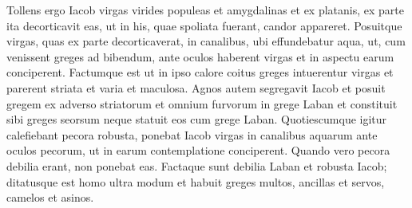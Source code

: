 \begin{biblechapter}
\begin{biblechapter}
\begin{biblechapter}
\begin{biblechapter}
\begin{biblechapter}
\begin{biblechapter}
\begin{biblechapter}
\begin{biblechapter}
\begin{biblechapter}
\begin{biblechapter}
\begin{biblechapter}
\begin{biblechapter}
\begin{biblechapter}
\begin{biblechapter}
\begin{biblechapter}
\begin{biblechapter}
\begin{biblechapter}
\begin{biblechapter}
\begin{biblechapter}
\begin{biblechapter}
\begin{biblechapter}
\begin{biblechapter}
\begin{biblechapter}
\begin{biblechapter}
\begin{biblechapter}
\begin{biblechapter}
\begin{biblechapter}
\begin{biblechapter}
\begin{biblechapter}
\begin{biblechapter}
 \verse Tollens ergo Iacob virgas virides populeas et amygdalinas et ex platanis, ex parte ita decorticavit eas, ut in his, quae spoliata fuerant, candor appareret. 
\verse Posuitque virgas, quas ex parte decorticaverat, in canalibus, ubi effundebatur aqua, ut, cum venissent greges ad bibendum, ante oculos haberent virgas et in aspectu earum conciperent. 
\verse Factumque est ut in ipso calore coitus greges intuerentur virgas et parerent striata et varia et maculosa.
 \verse Agnos autem segregavit Iacob et posuit gregem ex adverso striatorum et omnium furvorum in grege Laban et constituit sibi greges seorsum neque statuit eos cum grege Laban. 
\verse Quotiescumque igitur calefiebant pecora robusta, ponebat Iacob virgas in canalibus aquarum ante oculos pecorum, ut in earum contemplatione conciperent. 
\verse Quando vero pecora debilia erant, non ponebat eas. Factaque sunt debilia Laban et robusta Iacob; 
\verse ditatusque est homo ultra modum et habuit greges multos, ancillas et servos, camelos et asinos.
 

\end{biblechapter}
\end{biblechapter}
\end{biblechapter}
\end{biblechapter}
\end{biblechapter}
\end{biblechapter}
\end{biblechapter}
\end{biblechapter}
\end{biblechapter}
\end{biblechapter}
\end{biblechapter}
\end{biblechapter}
\end{biblechapter}
\end{biblechapter}
\end{biblechapter}
\end{biblechapter}
\end{biblechapter}
\end{biblechapter}
\end{biblechapter}
\end{biblechapter}
\end{biblechapter}
\end{biblechapter}
\end{biblechapter}
\end{biblechapter}
\end{biblechapter}
\end{biblechapter}
\end{biblechapter}
\end{biblechapter}
\end{biblechapter}
\end{biblechapter}
